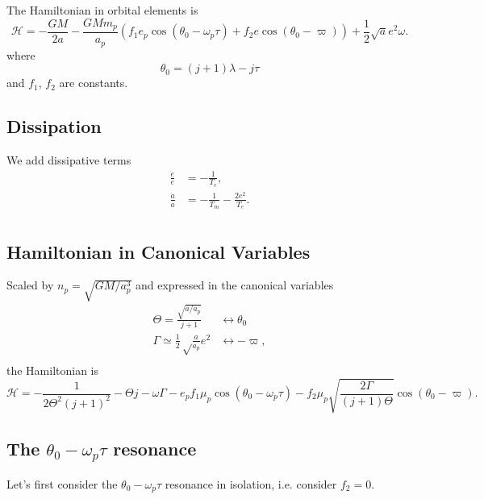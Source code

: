 \documentclass{article}
\begin{document}
The Hamiltonian in orbital elements is
\begin{equation}
    \label{eq:TPH}
    \mathcal H=-\frac{GM}{2a}
    -\frac{GMm_p}{a_p}\left(
    f_1e_p\cos(\theta_0 - \omega_p\tau)
    +f_2e\cos(\theta_0 - \varpi)
    \right)
    + \frac12\sqrt{a}e^2\omega.
\end{equation}
where
\begin{equation}
    \theta_0    =(j+1)\lambda -j\tau
\end{equation}
and $f_1$, $f_2$ are constants.

\subsection{Dissipation}
We add dissipative terms
\begin{align}
    \frac{\dot e}{e} & = - \frac{1}{T_e},                   \\
    \frac{\dot a}{a} & = -\frac{1}{T_m} - \frac{2e^2}{T_e}. \\
\end{align}

\subsection{Hamiltonian in Canonical Variables}
Scaled by $n_p=\sqrt{GM/a_p^3}$ and expressed in the canonical variables
\begin{align}
    \Theta=\frac{\sqrt{a/a_p}}{j+1}           & \longleftrightarrow \theta_0 \\
    \Gamma\simeq\frac12\sqrt\frac{a}{a_p} e^2 & \longleftrightarrow -\varpi, \\
\end{align}
the Hamiltonian is
\begin{equation}
    \mathcal H =
    - \frac{1}{2 \Theta^{2} \left(j + 1\right)^{2}}
    - \Theta j - \omega\Gamma
    - e_{p} f_{1} \mu_{p} \cos{\left(\theta_0-\omega_{p} \tau \right)}
    - f_{2} \mu_{p} \sqrt{\frac{2\Gamma}{(j + 1)\Theta}} \cos(\theta_0 -\varpi).
\end{equation}


\subsection{The $\theta_0-\omega_p \tau$ resonance}
Let's first consider the $\theta_0-\omega_p\tau$ resonance in isolation, i.e. consider $f_2=0$.
\end{document}
